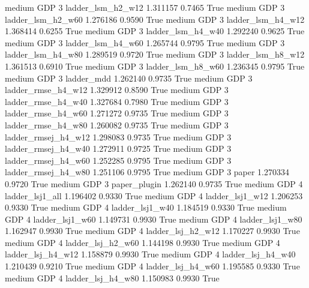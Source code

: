     medium      GDP                 3   ladder_lsm_h2_w12   1.311157      0.7465    True
    medium      GDP                 3   ladder_lsm_h2_w60   1.276186      0.9590    True
    medium      GDP                 3   ladder_lsm_h4_w12   1.368414      0.6255    True
    medium      GDP                 3   ladder_lsm_h4_w40   1.292240      0.9625    True
    medium      GDP                 3   ladder_lsm_h4_w60   1.265744      0.9795    True
    medium      GDP                 3   ladder_lsm_h4_w80   1.289519      0.9720    True
    medium      GDP                 3   ladder_lsm_h8_w12   1.361513      0.6910    True
    medium      GDP                 3   ladder_lsm_h8_w60   1.236345      0.9795    True
    medium      GDP                 3          ladder_mdd   1.262140      0.9735    True
    medium      GDP                 3  ladder_rmse_h4_w12   1.329912      0.8590    True
    medium      GDP                 3  ladder_rmse_h4_w40   1.327684      0.7980    True
    medium      GDP                 3  ladder_rmse_h4_w60   1.271272      0.9735    True
    medium      GDP                 3  ladder_rmse_h4_w80   1.260082      0.9735    True
    medium      GDP                 3 ladder_rmsej_h4_w12   1.298083      0.9735    True
    medium      GDP                 3 ladder_rmsej_h4_w40   1.272911      0.9725    True
    medium      GDP                 3 ladder_rmsej_h4_w60   1.252285      0.9795    True
    medium      GDP                 3 ladder_rmsej_h4_w80   1.251106      0.9795    True
    medium      GDP                 3               paper   1.270334      0.9720    True
    medium      GDP                 3        paper_plugin   1.262140      0.9735    True
    medium      GDP                 4     ladder_lsj1_all   1.196402      0.9330    True
    medium      GDP                 4     ladder_lsj1_w12   1.206253      0.9330    True
    medium      GDP                 4     ladder_lsj1_w40   1.184519      0.9330    True
    medium      GDP                 4     ladder_lsj1_w60   1.149731      0.9930    True
    medium      GDP                 4     ladder_lsj1_w80   1.162947      0.9930    True
    medium      GDP                 4   ladder_lsj_h2_w12   1.170227      0.9930    True
    medium      GDP                 4   ladder_lsj_h2_w60   1.144198      0.9930    True
    medium      GDP                 4   ladder_lsj_h4_w12   1.158879      0.9930    True
    medium      GDP                 4   ladder_lsj_h4_w40   1.210439      0.9210    True
    medium      GDP                 4   ladder_lsj_h4_w60   1.195585      0.9330    True
    medium      GDP                 4   ladder_lsj_h4_w80   1.150983      0.9930    True
